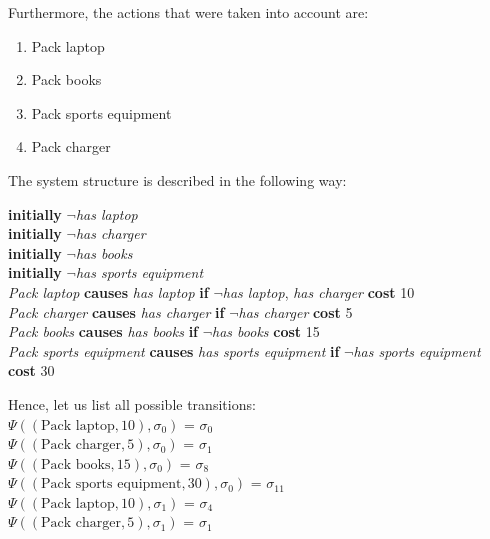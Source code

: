 \documentclass[a4paper]{article}
\begin{document}
Furthermore, the actions that were taken into account are:
\begin{enumerate}
    \item Pack laptop
    \item Pack books
    \item Pack sports equipment
    \item Pack charger
\end{enumerate}
The system structure is described in the following way:
\begin{center}
    \textbf{initially} $\neg$\textit{has laptop} \\[0.1\baselineskip]
    \textbf{initially} $\neg$\textit{has charger} \\[0.1\baselineskip]
    \textbf{initially} $\neg$\textit{has books} \\[0.1\baselineskip]
    \textbf{initially} $\neg$\textit{has sports equipment} \\[0.1\baselineskip]
    \textit{Pack laptop} \textbf{causes} \textit{has laptop} \textbf{if} $\neg$\textit{has laptop}, \textit{has charger} \textbf{cost} 10 \\[0.1\baselineskip]
    \textit{Pack charger} \textbf{causes} \textit{has charger}  \textbf{if} $\neg$\textit{has charger} \textbf{cost} 5 \\[0.1\baselineskip]
    \textit{Pack books} \textbf{causes} \textit{has books} \textbf{if} $\neg$\textit{has books} \textbf{cost} 15 \\[0.1\baselineskip]
    \textit{Pack sports equipment} \textbf{causes} \textit{has sports equipment} \textbf{if} $\neg$\textit{has sports equipment} \textbf{cost} 30 \\[0.1\baselineskip]
\end{center}
Hence, let us list all possible transitions: \\[0.5\baselineskip] 
$\Psi((\text{Pack laptop},10),\sigma_0)$ = $\sigma_0$ \\[0.1\baselineskip] 
$\Psi((\text{Pack charger},5),\sigma_0)$ = $\sigma_1$ \\[0.1\baselineskip] 
$\Psi((\text{Pack books},15),\sigma_0)$ = $\sigma_8$ \\[0.1\baselineskip] 
$\Psi((\text{Pack sports equipment},30),\sigma_0)$ = $\sigma_{11}$ \\[0.7\baselineskip]
$\Psi((\text{Pack laptop},10),\sigma_1)$ = $\sigma_4$ \\[0.1\baselineskip] 
$\Psi((\text{Pack charger},5),\sigma_1)$ = $\sigma_1$ \\[0.1\baselineskip] 
\end{document}
